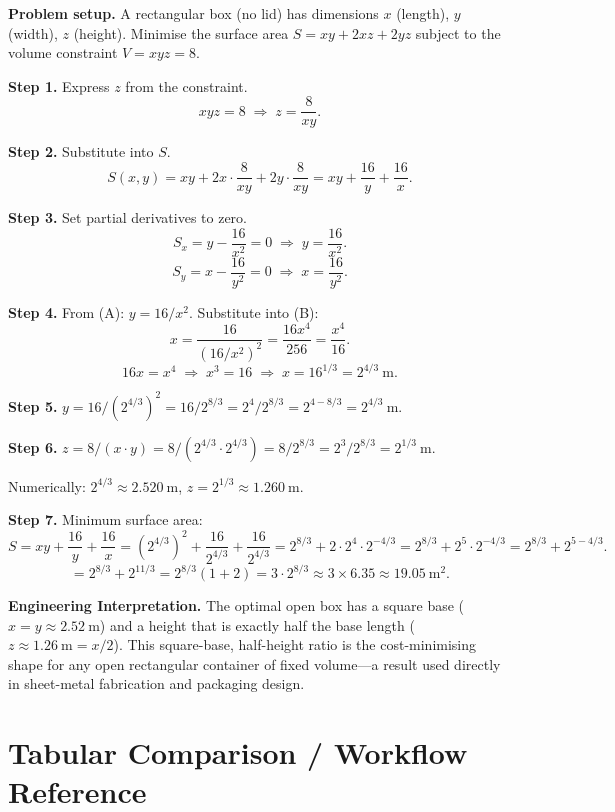 \documentclass[12pt,a4paper]{article}
\begin{document}
\textbf{Problem setup.} A rectangular box (no lid) has dimensions $x$ (length), $y$ (width), $z$ (height). Minimise the surface area $S = xy + 2xz + 2yz$ subject to the volume constraint $V = xyz = 8$.

\textbf{Step 1.} Express $z$ from the constraint.
\[
  xyz = 8 \;\Rightarrow\; z = \frac{8}{xy}.
\]

\textbf{Step 2.} Substitute into $S$.
\[
  S(x,y) = xy + 2x\cdot\frac{8}{xy} + 2y\cdot\frac{8}{xy}
          = xy + \frac{16}{y} + \frac{16}{x}.
\]

\textbf{Step 3.} Set partial derivatives to zero.
\[
  S_x = y - \frac{16}{x^{2}} = 0 \;\Rightarrow\; y = \frac{16}{x^{2}}. \tag{A}
\]
\[
  S_y = x - \frac{16}{y^{2}} = 0 \;\Rightarrow\; x = \frac{16}{y^{2}}. \tag{B}
\]

\textbf{Step 4.} From (A): $y = 16/x^{2}$. Substitute into (B):
\[
  x = \frac{16}{(16/x^{2})^{2}} = \frac{16 x^{4}}{256} = \frac{x^{4}}{16}.
\]
\[
  16x = x^{4} \;\Rightarrow\; x^{3} = 16 \;\Rightarrow\; x = 16^{1/3} = 2^{4/3}\ \mathrm{m}.
\]

\textbf{Step 5.} $y = 16/(2^{4/3})^{2} = 16/2^{8/3} = 2^{4}/2^{8/3} = 2^{4-8/3} = 2^{4/3}\ \mathrm{m}$.

\textbf{Step 6.} $z = 8/(x\cdot y) = 8/(2^{4/3}\cdot 2^{4/3}) = 8/2^{8/3} = 2^{3}/2^{8/3} = 2^{1/3}\ \mathrm{m}$.

Numerically: $2^{4/3} \approx 2.520\ \mathrm{m}$, $z = 2^{1/3} \approx 1.260\ \mathrm{m}$.

\textbf{Step 7.} Minimum surface area:
\[
  S = xy + \frac{16}{y} + \frac{16}{x}
  = (2^{4/3})^{2} + \frac{16}{2^{4/3}} + \frac{16}{2^{4/3}}
  = 2^{8/3} + 2 \cdot 2^{4} \cdot 2^{-4/3}
  = 2^{8/3} + 2^{5} \cdot 2^{-4/3}
  = 2^{8/3} + 2^{5-4/3}.
\]
\[
  = 2^{8/3} + 2^{11/3}
  = 2^{8/3}(1 + 2)
  = 3 \cdot 2^{8/3} \approx 3 \times 6.35 \approx 19.05\ \mathrm{m}^{2}.
\]

\textbf{Engineering Interpretation.} The optimal open box has a square base ($x = y \approx 2.52\ \mathrm{m}$) and a height that is exactly half the base length ($z \approx 1.26\ \mathrm{m} = x/2$). This square-base, half-height ratio is the cost-minimising shape for any open rectangular container of fixed volume---a result used directly in sheet-metal fabrication and packaging design.

\section{Tabular Comparison / Workflow Reference}
\end{document}
